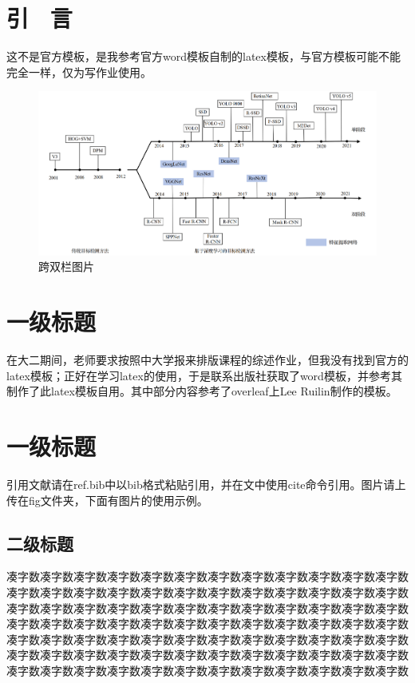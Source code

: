 \documentclass{article}
\begin{document}
\begin{multicols}{2}

\section{ 引 \ 言}
\songti  %
这不是官方模板，是我参考官方word模板自制的latex模板，与官方模板可能不能完全一样，仅为写作业使用。
\begin{figure}[t]
    \centering
    \includegraphics[width=\textwidth]{fig/发展历程.png}
    \caption{跨双栏图片\cite{计算机工程与应用04_fig}}
    \label{fig:发展历程}
\end{figure}

\section{一级标题}
在大二期间，老师要求按照中大学报来排版课程的综述作业，但我没有找到官方的latex模板；正好在学习latex的使用，于是联系出版社获取了word模板，并参考其制作了此latex模板自用。其中部分内容参考了overleaf上Lee Ruilin制作的模板。

\section{一级标题}
引用文献请在ref.bib中以bib格式粘贴引用，并在文中使用cite命令引用。图片请上传在fig文件夹，下面有图片的使用示例。

\subsection{二级标题}
凑字数凑字数凑字数凑字数凑字数凑字数凑字数凑字数凑字数凑字数凑字数凑字数凑字数凑字数凑字数凑字数凑字数凑字数凑字数凑字数凑字数凑字数凑字数凑字数凑字数凑字数凑字数凑字数凑字数凑字数凑字数凑字数凑字数凑字数凑字数凑字数凑字数凑字数凑字数凑字数凑字数凑字数凑字数凑字数凑字数凑字数凑字数凑字数凑字数凑字数凑字数凑字数凑字数凑字数凑字数凑字数凑字数凑字数凑字数凑字数凑字数凑字数凑字数凑字数凑字数凑字数凑字数凑字数凑字数凑字数凑字数凑字数凑字数凑字数凑字数凑字数凑字数凑字数凑字数凑字数凑字数凑字数凑字数凑字数


\end{multicols}
\end{document}
